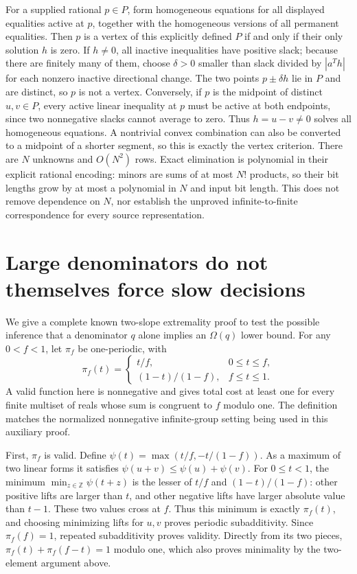\documentclass[11pt]{article}
\begin{document}
For a supplied rational $p\in P$, form homogeneous equations for all displayed
equalities active at $p$, together with the homogeneous versions of all
permanent equalities. Then $p$ is a vertex of this explicitly defined $P$
if and only if their only solution $h$ is zero. If $h\ne0$, all inactive
inequalities have positive slack; because there are finitely many of them,
choose $\delta>0$ smaller than slack divided by $|a^Th|$ for each nonzero
inactive directional change. The two points $p\pm\delta h$ lie in $P$ and
are distinct, so $p$ is not a vertex. Conversely, if $p$ is the midpoint of
distinct $u,v\in P$, every active linear inequality at $p$ must be active
at both endpoints, since two nonnegative slacks cannot average to zero.
Thus $h=u-v\ne0$ solves all homogeneous equations. A nontrivial convex
combination can also be converted to a midpoint of a shorter segment, so
this is exactly the vertex criterion.
There are $N$ unknowns and $O(N^2)$ rows. Exact elimination is polynomial
in their explicit rational encoding: minors are sums of at most $N!$ products,
so their bit lengths grow by at most a polynomial in $N$ and input bit length.
This does not remove dependence on $N$, nor establish the unproved
infinite-to-finite correspondence for every source representation.

\section{Large denominators do not themselves force slow decisions}
We give a complete known two-slope extremality proof to test the possible
inference that a denominator $q$ alone implies an $\Omega(q)$ lower bound.
For any $0<f<1$, let $\pi_f$ be one-periodic, with
\[
\pi_f(t)=\begin{cases}t/f,&0\le t\le f,\\(1-t)/(1-f),&f\le t\le1.
\end{cases}
\]
A valid function here is nonnegative and gives total cost at least one for
every finite multiset of reals whose sum is congruent to $f$ modulo one.
The definition matches the normalized nonnegative infinite-group setting
being used in this auxiliary proof.

First, $\pi_f$ is valid. Define
$\psi(t)=\max(t/f,-t/(1-f))$. As a maximum of two linear forms it satisfies
$\psi(u+v)\le\psi(u)+\psi(v)$. For $0\le t<1$, the minimum
$\min_{z\in\mathbb Z}\psi(t+z)$ is the lesser of $t/f$ and
$(1-t)/(1-f)$: other positive lifts are larger than $t$, and other negative
lifts have larger absolute value than $t-1$. These two values cross at $f$.
Thus this minimum is exactly $\pi_f(t)$, and choosing minimizing lifts for
$u,v$ proves periodic subadditivity. Since $\pi_f(f)=1$, repeated
subadditivity proves validity. Directly from its two pieces,
$\pi_f(t)+\pi_f(f-t)=1$ modulo one, which also proves minimality by the
two-element argument above.
\end{document}
